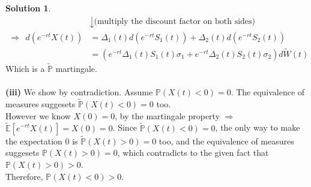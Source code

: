 \documentclass[a4paper, 10pt]{article}
\theoremstyle{definition}
\theoremstyle{hSol}
\newtheorem*{solution}{Solution}
\begin{document}
\begin{solution}
\begin{equation}
\begin{split}
		&\downarrow \text{(multiply the discount factor on both sides)}\\
		\Rightarrow~~ d(e^{-rt}X(t)) &= \Delta_1(t)d(e^{-rt}S_1(t)) + \Delta_2(t)d(e^{-rt}S_2(t)) \\
		&= \left(e^{-rt}\Delta_1(t)S_1(t)\sigma_1 + e^{-rt}\Delta_2(t)S_2(t)\sigma_2\right) d\widetilde{W}(t)
	\end{split}
\end{equation}
Which is a $\widetilde{\mathbb{P}}$ martingale.\\
~\\
\textbf{(iii)} We show by contradiction. Assume $\mathbb{P}\left(X(t)<0\right)=0$. The equivalence of measures suggesets $\widetilde{\mathbb{P}}\left(X(t)<0\right)=0$ too. \\ 
However we know $X(0)=0$, by the martingale property $\Rightarrow$ $\widetilde{\mathbb{E}}\left[e^{-rt}X(t)\right] = X(0)=0$. Since $\widetilde{\mathbb{P}}\left(X(t)<0\right)=0$, the only way to make the expectation $0$ is $\widetilde{\mathbb{P}}\left(X(t)>0\right)=0$ too, and the equivalence of measures suggesets $\mathbb{P}\left(X(t)>0\right)=0$, which contradicts to the given fact that $\mathbb{P}\left(X(t)>0\right)>0$. \\
Therefore, $\mathbb{P}\left(X(t)<0\right)>0$.
\end{solution}
\end{document}
